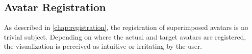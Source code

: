 \subsection{Avatar Registration \label{sec:register}}
As described in \autoref{chap:registration}, the registration of superimposed avatars is no trivial subject. Depending on where the actual and target avatars are registered, the visualization is perceived as intuitive or irritating by the user.


